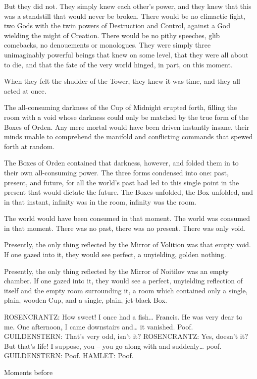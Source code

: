 But they did not. They simply knew each other’s power, and they knew that this was a standstill that would never be broken. There would be no climactic fight, two Gods with the twin powers of Destruction and Control, against a God wielding the might of Creation. There would be no pithy speeches, glib comebacks, no denouements or monologues. They were simply three unimaginably powerful beings that knew on some level, that they were all about to die, and that the fate of the very world hinged, in part, on this moment.

When they felt the shudder of the Tower, they knew it was time, and they all acted at once.

The all-consuming darkness of the Cup of Midnight erupted forth, filling the room with a void whose darkness could only be matched by the true form of the Boxes of Orden. Any mere mortal would have been driven instantly insane, their minds unable to comprehend the manifold and conflicting commands that spewed forth at random.

The Boxes of Orden contained that darkness, however, and folded them in to their own all-consuming power. The three forms condensed into one: past, present, and future, for all the world’s past had led to this single point in the present that would dictate the future. The Boxes unfolded, the Box unfolded, and in that instant, infinity was in the room, infinity was the room.

The world would have been consumed in that moment. The world was consumed in that moment. There was no past, there was no present. There was only void.

Presently, the only thing reflected by the Mirror of Volition was that empty void. If one gazed into it, they would see perfect, a unyielding, golden nothing.

Presently, the only thing reflected by the Mirror of Noitilov was an empty chamber. If one gazed into it, they would see a perfect, unyielding reflection of itself and the empty room surrounding it, a room which contained only a single, plain, wooden Cup, and a single, plain, jet-black Box.

ROSENCRANTZ: How sweet! I once had a fish… Francis. He was very dear to me. One afternoon, I came downstairs and… it vanished. Poof.
GUILDENSTERN: That’s very odd, isn’t it?
ROSENCRANTZ: Yes, doesn’t it? But that’s life! I suppose, you – you go along with and suddenly… poof.
GUILDENSTERN: Poof.
HAMLET: Poof.

Moments before

